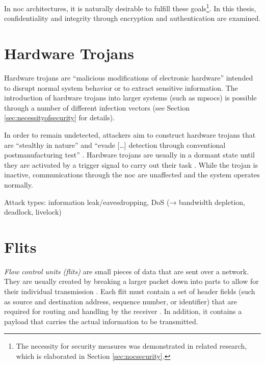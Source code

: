 In \gls{noc} architectures, it is naturally desirable to fulfill these goals\footnote{The necessity for security measures was demonstrated in
related research, which is elaborated in Section \ref{sec:nocsecurity}.}. In this thesis, confidentiality and integrity through encryption and
authentication are examined.

\section{Hardware Trojans}\label{sec:hardwaretrojans}
Hardware trojans are \enquote{malicious modifications of electronic hardware} \cite[1]{bhunia14hardwaretrojans} intended to disrupt normal
system behavior or to extract sensitive information. The introduction of hardware trojans into larger systems (such as \glspl{mpsoc}) is possible
through a number of different infection vectors (see Section \ref{sec:necessityofsecurity} for details).

In order to remain undetected, attackers aim to construct hardware trojans that are \enquote{stealthy in nature} \cite[1]{bhunia14hardwaretrojans}
and \enquote{evade […] detection through conventional postmanufacturing test} \cite[1]{bhunia14hardwaretrojans}. Hardware trojans are usually in a
dormant state until they are activated by a trigger signal to carry out their task \cites{bhunia14hardwaretrojans}{ancajas14fortnocs}. While the
trojan is inactive, communications through the \gls{noc} are unaffected and the system operates normally.

Attack types: information leak/eavesdropping, DoS (→ bandwidth depletion, deadlock, livelock)

\section{Flits}\label{sec:flits}
\textit{Flow control units (flits)} are small pieces of data that are sent over a network. They are usually created by breaking a larger
packet down into parts to allow for their individual transmission \cite[6]{flitslecturecmu}. Each flit must contain a set of header fields (such as source and
destination address, sequence number, or identifier) that are required for routing and handling by the receiver \cite[2]{flitslectureutah}.
In addition, it contains a payload that carries the actual information to be transmitted.

